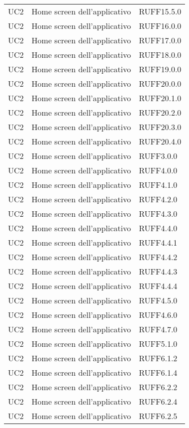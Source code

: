 \begin{longtable}{lp{}l}
UC2 & Home screen dell'applicativo & RUFF15.5.0 \\
UC2 & Home screen dell'applicativo & RUFF16.0.0 \\
UC2 & Home screen dell'applicativo & RUFF17.0.0 \\
UC2 & Home screen dell'applicativo & RUFF18.0.0 \\
UC2 & Home screen dell'applicativo & RUFF19.0.0 \\
UC2 & Home screen dell'applicativo & RUFF20.0.0 \\
UC2 & Home screen dell'applicativo & RUFF20.1.0 \\
UC2 & Home screen dell'applicativo & RUFF20.2.0 \\
UC2 & Home screen dell'applicativo & RUFF20.3.0 \\
UC2 & Home screen dell'applicativo & RUFF20.4.0 \\
UC2 & Home screen dell'applicativo & RUFF3.0.0 \\
UC2 & Home screen dell'applicativo & RUFF4.0.0 \\
UC2 & Home screen dell'applicativo & RUFF4.1.0 \\
UC2 & Home screen dell'applicativo & RUFF4.2.0 \\
UC2 & Home screen dell'applicativo & RUFF4.3.0 \\
UC2 & Home screen dell'applicativo & RUFF4.4.0 \\
UC2 & Home screen dell'applicativo & RUFF4.4.1 \\
UC2 & Home screen dell'applicativo & RUFF4.4.2 \\
UC2 & Home screen dell'applicativo & RUFF4.4.3 \\
UC2 & Home screen dell'applicativo & RUFF4.4.4 \\
UC2 & Home screen dell'applicativo & RUFF4.5.0 \\
UC2 & Home screen dell'applicativo & RUFF4.6.0 \\
UC2 & Home screen dell'applicativo & RUFF4.7.0 \\
UC2 & Home screen dell'applicativo & RUFF5.1.0 \\
UC2 & Home screen dell'applicativo & RUFF6.1.2 \\
UC2 & Home screen dell'applicativo & RUFF6.1.4 \\
UC2 & Home screen dell'applicativo & RUFF6.2.2 \\
UC2 & Home screen dell'applicativo & RUFF6.2.4 \\
UC2 & Home screen dell'applicativo & RUFF6.2.5 \\

\end{longtable}
